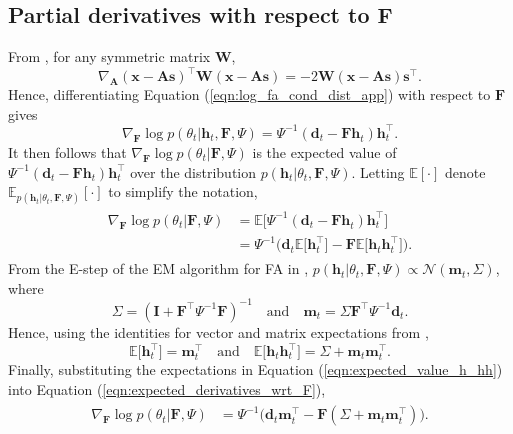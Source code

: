 \documentclass[msc,deptreport.inf]{infthesis} %
\newcommand{\matr}[1]{\mathbf{#1}}
\newcommand{\E}{\mathbb E}
\begin{document}
\subsection{Partial derivatives with respect to $\matr{F}$}

From \cite{petersen2012}, for any symmetric matrix $\matr{W}$,
\begin{equation}
	\nabla_{\matr{A}} (\matr{x} - \matr{As})^\intercal \matr{W} (\matr{x} - \matr{As}) = -2 \matr{W} (\matr{x} - \matr{As}) \matr{s}^\intercal.
\end{equation}
Hence, differentiating Equation (\ref{eqn:log_fa_cond_dist_app}) with respect to $\matr{F}$ gives
\begin{equation}
	\nabla_{\matr{F}} \log p(\theta_t | \matr{h}_t, \matr{F}, \Psi)
	= \Psi^{-1} (\matr{d}_t - \matr{Fh}_t) \matr{h}_t^\intercal.
\end{equation}
It then follows that $\nabla_{\matr{F}} \log p(\theta_t | \matr{F}, \Psi)$ is the expected value of $\Psi^{-1} (\matr{d}_t - \matr{Fh}_t) \matr{h}_t^\intercal$ over the distribution $p(\matr{h}_t | \theta_t, \matr{F}, \Psi)$. Letting $\E[\cdot]$ denote $\E_{p(\matr{h}_t | \theta_t, \matr{F}, \Psi)}[\cdot]$ to simplify the notation, 
\begin{align}\label{eqn:expected_derivatives_wrt_F}
\begin{split}
	\nabla_{\matr{F}} \log p(\theta_t | \matr{F}, \Psi) 
	& = \E \big[ \Psi^{-1} (\matr{d}_t - \matr{Fh}_t) \matr{h}_t^\intercal \big] \\
	& = \Psi^{-1}\big( \matr{d}_t \E \big[ \matr{h}_t^\intercal \big] 
	- \matr{F}  \E \big[ \matr{h}_t \matr{h}_t^\intercal \big]\big).
\end{split}
\end{align} 
From the E-step of the EM algorithm for FA in \cite{barber2007}, $p(\matr{h}_t | \theta_t, \matr{F}, \Psi) \propto \mathcal{N}(\matr{m}_t, \Sigma)$, where
\begin{equation}
	\Sigma = (\matr{I} + \matr{F}^\intercal \Psi^{-1} \matr{F})^{-1}
	\quad \text{and} \quad \matr{m}_t = \Sigma \matr{F}^\intercal \Psi^{-1} \matr{d}_t.
\end{equation}
Hence, using the identities for vector and matrix expectations from \cite{petersen2012}, 
\begin{equation}\label{eqn:expected_value_h_hh}
	\E \big[ \matr{h}_t^\intercal \big] = \matr{m}_t^\intercal \quad \text{and} \quad \E \big[ \matr{h}_t \matr{h}_t^\intercal \big] = \Sigma + \matr{m}_t \matr{m}_t^\intercal.
\end{equation}
Finally, substituting the expectations in Equation (\ref{eqn:expected_value_h_hh}) into Equation (\ref{eqn:expected_derivatives_wrt_F}), 
\begin{align}
\begin{split}
	\nabla_{\matr{F}} \log p(\theta_t | \matr{F}, \Psi) 
	& = \Psi^{-1} \big(\matr{d}_t \matr{m}_t^\intercal - \matr{F}  (\Sigma + \matr{m}_t \matr{m}_t^\intercal)\big).
\end{split}
\end{align} 
\end{document}

